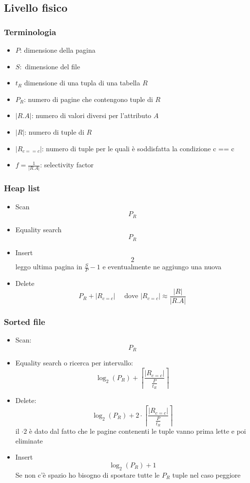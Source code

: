 \subsection{Livello fisico}
\subsubsection*{Terminologia}
\begin{itemize}
  \item $ P $: dimensione della pagina
  \item $ S: $ dimensione del file
  \item $ t_R $ dimensione di una tupla di una tabella $ R $
  \item $ P_R $: numero di pagine che contengono tuple di $ R $
  \item $ \left|R.A\right| $: numero di valori diversi per l'attributo $ A $
  \item $ \left|R\right| $: numero di tuple di $ R $
  \item $ \left|R_{c==c}\right| $: numero di tuple per le quali è soddisfatta la condizione c == c
  \item $ f= \frac{1}{\left|R.A\right|} $: selectivity factor
\end{itemize}

\subsubsection*{Heap list}
\begin{itemize}
  \item Scan 
    \[
    P_R
    \]
  \item Equality search
    \[
    P_R
    \]
  \item Insert 
    \[
    2
    \]
    leggo ultima pagina in $ \frac{S}{P}-1 $ e eventualmente ne aggiungo una nuova
  \item Delete 
    \[
    P_R + \left|R_{c=c}\right| \quad \text{ dove } \left|R_{c=c}\right| \approx \frac{\left|R\right|}{\left|R.A\right|}
    \]
\end{itemize}

\subsubsection*{Sorted file}
\begin{itemize}
  \item Scan:
    \[
    P_R
    \]
  \item Equality search o ricerca per intervallo: 
  \[
    \log_2\left(P_R\right) + \left\lceil \frac{\left|R_{c=c}\right|}{\frac{P}{t_R}} \right\rceil
  \]
  \item Delete: 
    \[
    \log_2\left(P_R\right) + 2 \cdot \left\lceil \frac{\left|R_{c=c}\right|}{\frac{P}{t_R}} \right\rceil
    \]
    il $ \cdot 2 $ è dato dal fatto che le pagine contenenti le tuple vanno prima lette e poi eliminate
  \item Insert
    \[
    \log_2\left(P_R\right) + 1
    \]
    Se non c'è spazio ho bisogno di spostare tutte le $ P_R $ tuple nel caso peggiore
\end{itemize}

